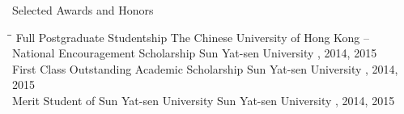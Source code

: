 
\begin{rSection}{Selected Awards and Honors}
\begin{tabbing}
\hspace{3.2in}\= \hspace{2.8in}\= \kill
    Full Postgraduate Studentship                \>The Chinese University of Hong Kong                       --      \\
    National Encouragement Scholarship      \> Sun Yat-sen University     , 2014, 2015 \\
    First Class Outstanding Academic Scholarship             \> Sun Yat-sen University     , 2014, 2015 \\
    Merit Student of Sun Yat-sen University                   \> Sun Yat-sen University     , 2014, 2015
\end{tabbing}
\end{rSection}

